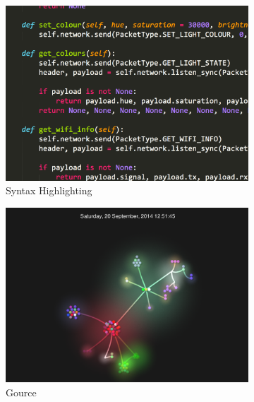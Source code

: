 
\begin{figure}
\centering
\begin{subfigure}{.5\textwidth}
  \includegraphics[width=.95\linewidth]{../images/code-visualisations/syntax-highlighting.png}
  \caption{Syntax Highlighting}
  \label{fig:syntax-highlighting}
\end{subfigure}%
\begin{subfigure}{.5\textwidth}
  \includegraphics[width=.95\linewidth]{../images/code-visualisations/gource.png}
  \caption{Gource \protect\cite{Caudwell2010}}
  \label{fig:gource}
\end{subfigure}\\
\vspace{5mm}
\begin{subfigure}{.5\textwidth}

\end{subfigure}
\end{figure}
